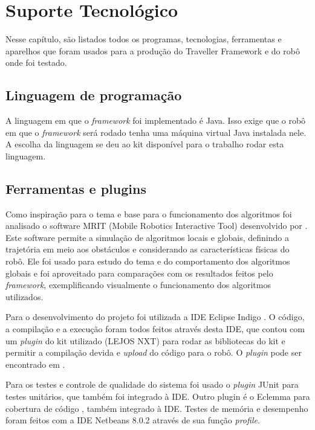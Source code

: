 \chapter[Suporte Tecnológico]{Suporte Tecnológico}

Nesse capítulo, são listados todos os programas, tecnologias, ferramentas e aparelhos que foram usados para a produção do Traveller Framework e do robô onde foi testado.

\section{Linguagem de programação}

A linguagem em que o \textit{framework} foi implementado é Java. Isso exige que o robô em que o \textit{framework} será rodado tenha uma máquina virtual Java instalada nele. A escolha da linguagem se deu ao kit disponível para o trabalho rodar esta linguagem.

\section{Ferramentas e plugins}

Como inspiração para o tema e base para o funcionamento dos algoritmos foi analisado o software MRIT (Mobile Robotics Interactive Tool) \cite{MRIT_SITE} desenvolvido por \cite{Guzman2008}. Este software permite a simulação de algoritmos locais e globais, definindo a trajetória em meio aos obstáculos e considerando as características físicas do robô. Ele foi usado para estudo do tema e do comportamento dos algoritmos globais e foi aproveitado para comparações com os resultados feitos pelo \textit{framework}, exemplificando visualmente o funcionamento dos algoritmos utilizados.

Para o desenvolvimento do projeto foi utilizada a IDE Eclipse Indigo \cite{ECLIPSE_SITE}. O código, a compilação e a execução foram todos feitos através desta IDE, que contou com um \textit{plugin} do kit utilizado (LEJOS NXT) para rodar as bibliotecas do kit e permitir a compilação devida e \textit{upload} do código para o robô. O \textit{plugin} pode ser encontrado em \cite{PLUGIN_NXT_SITE}.

Para os testes e controle de qualidade do sistema foi usado o \textit{plugin} JUnit \cite{JUNIT_SITE} para testes unitários, que também foi integrado à IDE. Outro plugin é o Eclemma para cobertura de código \cite{ECLEMMA_SITE}, também integrado à IDE. Testes de memória e desempenho foram feitos com a IDE Netbeans 8.0.2 através de sua função \textit{profile}.

